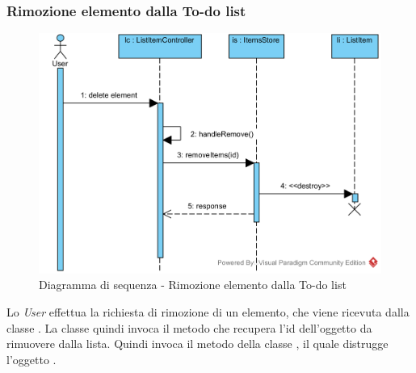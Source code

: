 \subsubsection{Rimozione elemento dalla To-do list}
\begin{figure}[H]
	\centering
	\includegraphics[width=15cm]{./diagrammi/sequenza/rimozione_elemento_todo.png}
	\caption{Diagramma di sequenza - Rimozione elemento dalla To-do list}
\end{figure}
Lo \textit{User} effettua la richiesta di rimozione di un elemento, che viene ricevuta dalla classe . La classe quindi invoca il metodo  che recupera l'id dell'oggetto da rimuovere dalla lista. Quindi invoca il metodo  della classe , il quale distrugge l'oggetto .

